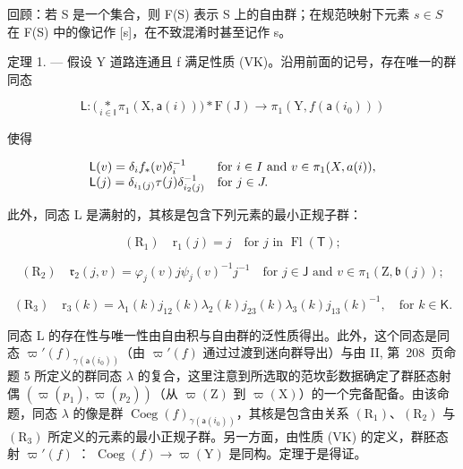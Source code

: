 回顾：若 S 是一个集合，则 F(S) 表示 S 上的自由群；在规范映射下元素 \(s \in S\) 在 F(S) 中的像记作 {[}s{]}，在不致混淆时甚至记作 s。

定理 1. --- 假设 Y 道路连通且 f 满足性质 (VK)。沿用前面的记号，存在唯一的群同态

\[
\mathsf {L} \colon \big (\underset {i \in \mathsf {I}} {\ast} \pi_ {1} (\mathrm{X}, \mathsf {a} (i)) \big) \ast \mathrm{F} (\mathrm{J}) \to \pi_ {1} (\mathrm{Y}, f (\mathsf {a} (i _ {0})))
\]

使得

\[
\begin{array}{l l} \mathsf {L} (v) = \delta_ {i} f _ {*} (v) \delta_ {i} ^ {- 1} & \text {for } i\in I \text { and } v\in\pi_{1} (X,a(i)), \\ \mathsf {L} (j) = \delta_ {i _ {1} (j)} \tau (j) \delta_ {i _ {2} (j)} ^ {- 1} & \text {for } j\in J. \end{array}
\]

此外，同态 L 是满射的，其核是包含下列元素的最小正规子群：

\[
\left(\mathrm{R} _ {1}\right) \quad \mathrm{r} _ {1} (j) = j \quad \text {for } j \text { in } \operatorname{Fl} (\mathsf {T});
\]

\[
\left(\mathrm{R} _ {2}\right) \quad \mathfrak {r} _ {2} (j, v) = \varphi_ {j} (v) j \psi_ {j} (v) ^ {- 1} j ^ {- 1} \quad \text {for } j \in \mathsf {J} \text { and } v \in \pi_ {1} (\mathrm{Z}, \mathfrak {b} (j));
\]

\[
\left(\mathrm{R} _ {3}\right) \quad \mathrm{r} _ {3} (k) = \lambda_ {1} (k) j _ {1 2} (k) \lambda_ {2} (k) j _ {2 3} (k) \lambda_ {3} (k) j _ {1 3} (k) ^ {- 1}, \quad \text {for } k \in \mathsf {K}.
\]

同态 L 的存在性与唯一性由自由积与自由群的泛性质得出。此外，这个同态是同态 \(\varpi'(f)_{\gamma(\mathsf{a}(i_0))}\)（由 \(\varpi'(f)\) 通过过渡到迷向群导出）与由 II, 第~208~页命题 5 所定义的群同态 \(\lambda\) 的复合，这里注意到所选取的范坎彭数据确定了群胚态射偶 \((\varpi(p_1), \varpi(p_2))\)（从 \(\varpi(\mathrm{Z})\) 到 \(\varpi(\mathrm{X})\)）的一个完备配备。由该命题，同态 \(\lambda\) 的像是群 \(\operatorname{Coeg}(f)_{\gamma(\mathsf{a}(i_0))}\)，其核是包含由关系 \((\mathrm{R}_1)\)、\((\mathrm{R}_2)\) 与 \((\mathrm{R}_3)\) 所定义的元素的最小正规子群。另一方面，由性质 (VK) 的定义，群胚态射 \(\varpi'(f)\) ： \(\operatorname{Coeg}(f) \to \varpi(\mathrm{Y})\) 是同构。定理于是得证。

